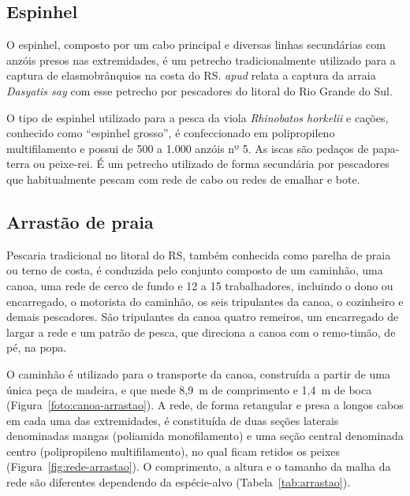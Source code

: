 \documentclass[a4paper,11pt,twoside,showtrims,onecolumn,openright,final]{memoir}
\begin{document}
\subsection*{Espinhel}

O espinhel, composto por um cabo principal e diversas 
linhas secundárias com anzóis presos nas extremidades,
é um petrecho tradicionalmente utilizado para a captura de elasmobrânquios
na costa do RS. \citet{gliesch1925} \emph{apud} \citet{ihering1968} 
relata a captura da arraia \emph{Dasyatis say} com esse petrecho
por pescadores do litoral do Rio Grande do Sul.

O tipo de espinhel utilizado para a pesca da viola \emph{Rhinobatos horkelii} e cações, 
conhecido como ``espinhel grosso'', é confeccionado em polipropileno multifilamento
e possui de 500 a 1.000 anzóis nº 5. As iscas são pedaços de papa-terra ou peixe-rei. 
É um petrecho utilizado de forma secundária por pescadores
que habitualmente pescam com rede de cabo ou redes de emalhar e bote.

\subsection*{Arrastão de praia}

Pescaria tradicional no litoral do RS, também conhecida como 
parelha de praia ou terno de costa, é conduzida pelo conjunto 
composto de um caminhão, uma canoa, uma rede de cerco de fundo
e 12 a 15 trabalhadores, incluindo o dono ou encarregado, o motorista do caminhão, 
os seis tripulantes da canoa, o cozinheiro e demais pescadores. São tripulantes da canoa 
quatro remeiros, um encarregado de largar a rede e um patrão de pesca, 
que direciona a canoa com o remo-timão, de pé, na popa. 

O caminhão é utilizado para o transporte da canoa, construída a partir de uma única 
peça de madeira, e que mede 8,9~m de comprimento e 1,4~m de boca (Figura~\ref{foto:canoa-arrastao}). 
A rede, de forma retangular e presa a longos cabos em
cada uma das extremidades, é constituída de duas seções laterais 
denominadas mangas (poliamida monofilamento) e uma seção central denominada 
centro (polipropileno multifilamento), no qual ficam 
retidos os peixes (Figura~\ref{fig:rede-arrastao}). O comprimento, a altura e o tamanho da malha 
da rede são diferentes dependendo da espécie-alvo (Tabela~\ref{tab:arrastao}).


\end{document}
